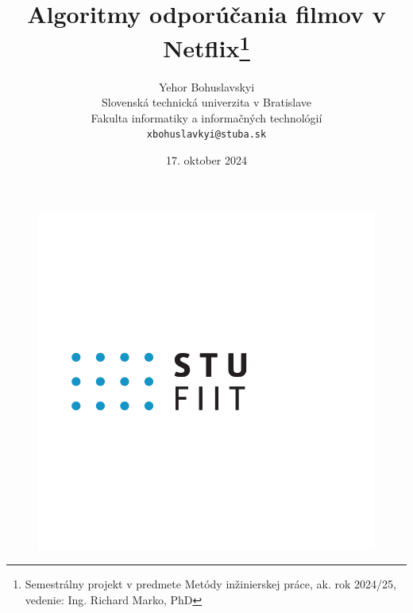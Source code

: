 \documentclass[10pt,slovak,a4paper]{article}
\title{Algoritmy odporúčania filmov v Netflix\thanks{Semestrálny projekt v predmete Metódy inžinierskej práce, ak. rok 2024/25, vedenie: Ing. Richard Marko, PhD}}
\author{Yehor Bohuslavskyi\\[2pt]
	{\small Slovenská technická univerzita v Bratislave}\\
	{\small Fakulta informatiky a informačných technológií}\\
	{\small \texttt{xbohuslavkyi@stuba.sk}}
	}
\date{\small 17. oktober 2024}
\begin{document}
\begin{figure}[h!]
  \centering
  \includegraphics[width=\textwidth]{Images_tables/fiit_logo.png} 
\end{figure}

\maketitle
\end{document}

